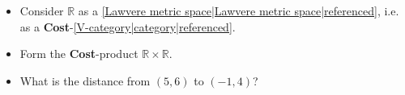 
\begin{itemize}
    \item  Consider $\mathbb{R}$ as a \ref{Lawvere metric space|Lawvere metric space|referenced}, i.e. as a \textbf{Cost}-\ref{V-category|category|referenced}.
    \item Form the \textbf{Cost}-product $\mathbb{R}\times\mathbb{R}$.
    \item What is the distance from $(5,6)$ to $(-1,4)$?
  \end{itemize}